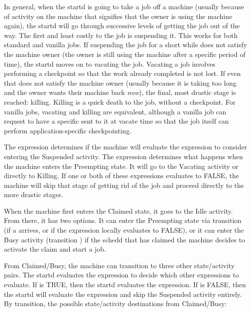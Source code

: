 In general, when the startd is going to take a job off a machine
(usually because of activity on the machine that signifies that the
owner is using the machine again),
the startd will go through
successive levels of getting the job out of the way.
The first and least costly to the job is suspending it.
This works for both standard and vanilla jobs.
If suspending the job for a short while does not satisfy the machine
owner (the owner is still using the machine after a specific period of
time), the startd moves on to vacating the job.
Vacating a job
involves performing a checkpoint so that the work already completed
is not lost.
If even that does not satisfy the machine owner (usually because it is
taking too long and the owner wants their machine back \emph{now}),
the final, most drastic stage is reached: killing.  
Killing is a quick death to the job, without a checkpoint.  
For vanilla jobs, vacating and killing are equivalent,
although a vanilla job can request to have a specific
sent to it at vacate time so that the job itself can perform
application-specific checkpointing.

The  expression determines if the machine will
evaluate the  expression to consider entering the
Suspended activity.
The  expression determines what happens when the
machine enters the Preempting state.
It will go to the Vacating
activity or directly to Killing. 
If one or both of these expressions evaluates to FALSE, the machine
will skip that stage of getting rid of the job and proceed directly to
the more drastic stages.

When the machine first enters the Claimed state, it goes to the Idle
activity.  From there, it has two options.  
It can enter the Preempting state via transition  (if a 
 arrives, or if the  expression locally
evaluates to FALSE),  
or it can enter the Busy activity (transition ) if the
schedd that has claimed the machine decides to activate the claim and
start a job.

From Claimed/Busy, the machine can transition to three other state/activity
pairs.
The startd evaluates the  expression to decide
which other expressions to evaluate.  
If  is TRUE, then the startd evaluates the
 expression.
If  is FALSE, then the startd will
evaluate the  expression and skip the Suspended activity
entirely.
By transition, the possible state/activity destinations from Claimed/Busy:

